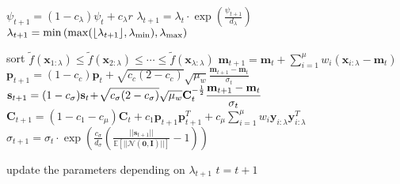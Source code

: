 \begin{algorithm}[t]
\begin{algorithmic}[1]
			\vspace*{2pt}
			\State {}
			\State  $\displaystyle \psi_{t+1}=(1-c_{\lambda})\psi_{t}+c_{\lambda}r$\label{opl-cma-es:psi}
			\State $\displaystyle \lambda_{t+1}=\lambda_{t}\cdot\exp\left( \frac{\psi_{t+1}}{d_{\lambda}} \right)$\label{opl-cma-es:lambda}
			\State $\displaystyle \lambda_{t+1}=\min\left(\max(\lfloor \lambda_{t+1} \rfloor, \lambda_{\rm min}), \lambda_{\rm max}\right)$\label{opl-cma-es:restrict}
			
			\vspace*{2pt}
			\State {}\label{opl-cma-es:update1}
			\State sort $\widetilde{f}(\mathbf{x}_{1:\lambda})\le \widetilde{f}(\mathbf{x}_{2:\lambda})\le\cdots\le \widetilde{f}(\mathbf{x}_{\lambda:\lambda})$
			\State $\mathbf{m}_{t+1}=\mathbf{m}_{t}+\sum_{i=1}^{\mu}w_{i}(\mathbf{x}_{i:\lambda}-\mathbf{m}_{t})$
			\State $\mathbf{p}_{t+1}=(1-c_{c})\mathbf{p}_{t}\!+\!\sqrt{c_{c}(2-c_{c})}\sqrt{\mu_{w}}\frac{\mathbf{m}_{t+1}-\mathbf{m}_{t}}{\sigma_{t}}$
			\State $\displaystyle \small{\mathbf{s}_{t+1}=(1-c_{\sigma})\mathbf{s}_{t}\!+\!\sqrt{c_{\sigma}(2-c_{\sigma})}\sqrt{\mu_{w}}\mathbf{C}_{t}^{-\frac{1}{2}}\frac{\mathbf{m}_{t+1}-\mathbf{m}_{t}}{\sigma_{t}}}$
			\State \small{$\displaystyle \mathbf{C}_{t+1}=(1-c_{1}-c_{\mu})\mathbf{C}_{t}+c_{1}\mathbf{p}_{t+1}\mathbf{p}_{t+1}^{T}+c_{\mu}\sum_{i=1}^{\mu}w_{i}\mathbf{y}_{i:\lambda}\mathbf{y}_{i:\lambda}^{T}$}
			\normalsize
			\State $\displaystyle \sigma_{t+1}=\sigma_{t}\cdot\exp\left(\frac{c_{\sigma}}{d_{\sigma}}\left(\frac{||\mathbf{s}_{t+1}||}{\mathbb{E}[||\mathcal{N}(\mathbf{0},\mathbf{I})||]}-1\right)\right)$\label{opl-cma-es:update2}
			
			\vspace*{2pt}
			\label{opl-cma-es:change1}
			\State update the parameters depending on $\lambda_{t+1}$
			\EndIf\label{opl-cma-es:change2}
			\State $t=t+1$
		\end{algorithmic}
\end{algorithm}
